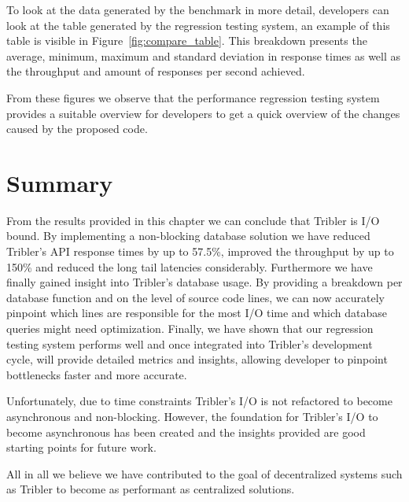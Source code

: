 To look at the data generated by the benchmark in more detail, developers can look at the table generated by the regression testing system, an example of this table is visible in Figure~\ref{fig:compare_table}.
This breakdown presents the average, minimum, maximum and standard deviation in response times as well as the throughput and amount of responses per second achieved.

From these figures we observe that the performance regression testing system provides a suitable overview for developers to get a quick overview of the changes caused by the proposed code.

\section{Summary}

From the results provided in this chapter we can conclude that Tribler is I/O bound.
By implementing a non-blocking database solution we have reduced Tribler's API response times by up to 57.5\%, improved the throughput by up to 150\% and reduced the long tail latencies considerably.
Furthermore we have finally gained insight into Tribler's database usage.
By providing a breakdown per database function and on the level of source code lines, we can now accurately pinpoint which lines are responsible for the most I/O time and which database queries might need optimization.
Finally, we have shown that our regression testing system performs well and once integrated into Tribler's development cycle, will provide detailed metrics and insights, allowing developer to pinpoint bottlenecks faster and more accurate.

Unfortunately, due to time constraints Tribler's I/O is not refactored to become asynchronous and non-blocking.
However, the foundation for Tribler's I/O to become asynchronous has been created and the insights provided are good starting points for future work.

All in all we believe we have contributed to the goal of decentralized systems such as Tribler to become as performant as centralized solutions. 
